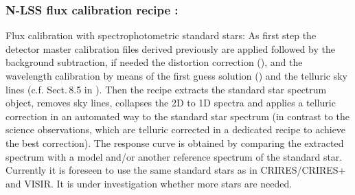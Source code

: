 \clearpage

\subsubsection{N-LSS flux calibration recipe :}\label{rec:lssnflux}
Flux calibration with spectrophotometric standard stars: As first step the detector master calibration files derived previously are applied followed by the background subtraction, if needed the distortion correction (), and
the wavelength calibration by means of the first guess solution () and the telluric sky lines (c.f. Sect.\,8.5 in \cite{DRLS}). Then the recipe extracts the standard star spectrum object, removes sky lines, collapses the 2D to 1D spectra and applies a telluric correction in an automated way to the standard star spectrum (in contrast to the science observations, which are telluric corrected in a dedicated recipe to achieve the best correction). The response curve is obtained by comparing the extracted spectrum with a model and/or another reference spectrum of the standard star. Currently it is foreseen to use the same standard stars as in \ac{CRIRES}/CRIRES+ and \ac{VISIR}. It is under investigation whether more stars are needed.
